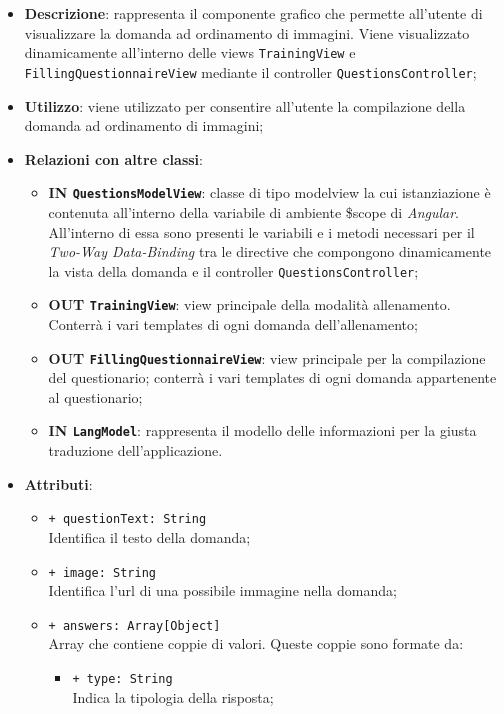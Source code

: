 		\begin{itemize}
			\item \textbf{Descrizione}: rappresenta il componente grafico che permette all'utente di visualizzare la domanda ad ordinamento di immagini. Viene visualizzato dinamicamente all'interno delle views \texttt{TrainingView} e \texttt{FillingQuestionnaireView} mediante il controller \texttt{QuestionsController};
			\item \textbf{Utilizzo}: viene utilizzato per consentire all'utente la compilazione della domanda ad ordinamento di immagini;
			\item \textbf{Relazioni con altre classi}: 
			\begin{itemize}
				\item \textbf{IN \texttt{QuestionsModelView}}: classe di tipo modelview la cui istanziazione è contenuta all'interno della variabile di ambiente \$scope di \textit{Angular}. All'interno di essa sono presenti le variabili e i metodi necessari per il \textit{Two-Way Data-Binding} tra le directive che compongono dinamicamente la vista della domanda e il controller \texttt{QuestionsController};
				\item \textbf{OUT \texttt{TrainingView}}: view principale della modalità allenamento. Conterrà i vari templates di ogni domanda dell'allenamento;
				\item \textbf{OUT \texttt{FillingQuestionnaireView}}: view principale per la compilazione del questionario; conterrà i vari templates di ogni domanda appartenente al questionario;   
				\item \textbf{IN \texttt{LangModel}}: rappresenta il modello delle informazioni per la giusta traduzione dell'applicazione.
			\end{itemize}
			\item \textbf{Attributi}: 
			\begin{itemize}
				\item \texttt{+ questionText: String} \\ Identifica il testo della domanda;
				\item \texttt{+ image: String} \\ Identifica l'url di una possibile immagine nella domanda;
				\item \texttt{+ answers: Array[Object]} \\ Array che contiene coppie di valori. Queste coppie sono formate da:
				\begin{itemize}
					\item \texttt{+ type: String} \\ Indica la tipologia della risposta;

\end{itemize}
\end{itemize}
\end{itemize}
